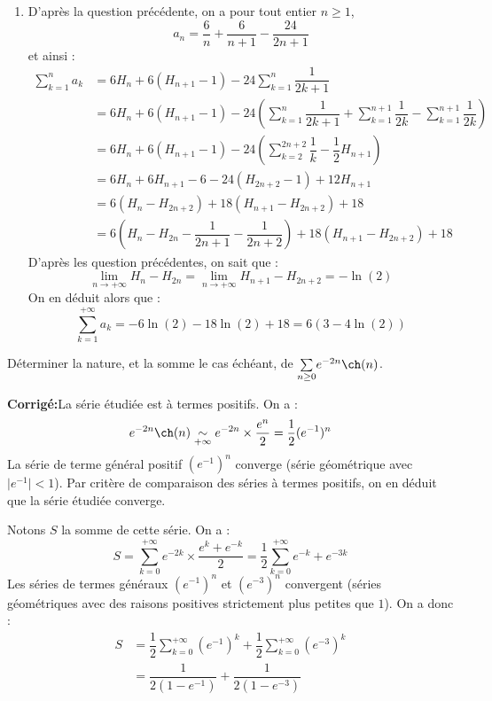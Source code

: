 \documentclass[a4paper,twoside,french,10pt]{VcCours}
\newcommand{\corr}{\textbf{Corrigé:}}
\newcommand{\Sum}[2]{\ensuremath{\textstyle{\sum\limits_{#1}^{#2}}}}
\begin{document}
\begin{enumerate}
\item D'après la question précédente, on a pour tout entier $n \geq 1$,
$$ a_n = \dfrac{6}{n} + \dfrac{6}{n+1} - \dfrac{24}{2n+1}$$
et ainsi :
\begin{align*}
\sum_{k=1}^n a_k & = 6 H_n + 6(H_{n+1}-1)- 24 \sum_{k=1}^n \dfrac{1}{2k+1} \\
& = 6 H_n + 6(H_{n+1}-1)- 24 \left( \sum_{k=1}^n \dfrac{1}{2k+1} +  \sum_{k=1}^{n+1} \dfrac{1}{2k} - \sum_{k=1}^{n+1} \dfrac{1}{2k} \right) \\
& =6 H_n + 6(H_{n+1}-1)-24 \left( \sum_{k=2}^{2n+2} \dfrac{1}{k} -  \dfrac{1}{2} H_{n+1} \right) \\
& = 6H_n + 6 H_{n+1} - 6 - 24 (H_{2n+2}-1) + 12 H_{n+1} \\
& = 6(H_n - H_{2n+2}) + 18(H_{n+1}- H_{2n+2}) + 18 \\
& = 6 \left( H_n - H_{2n} - \dfrac{1}{2n+1} - \dfrac{1}{2n+2} \right) + 18 (H_{n+1}- H_{2n+2})  + 18
\end{align*}
D'après les question précédentes, on sait que :
$$ \lim_{n \rightarrow + \infty} H_n- H_{2n} = \lim_{n \rightarrow + \infty} H_{n+1}- H_{2n+2} = - \ln(2)$$
On en déduit alors que :
$$ \sum_{k=1}^{+ \infty} a_k = -6\ln(2) -18 \ln(2) + 18 = 6(3- 4 \ln(2))$$
\end{enumerate}

\medskip

\begin{Exercice}{} Déterminer la nature, et la somme le cas échéant, de $\Sum{n \geq 0}{} e^{-2n} \ch(n)$.
\end{Exercice}

\corr La série étudiée est à termes positifs. On a :
$$ e^{-2n} \ch(n) \underset{+ \infty}{\sim} e^{-2n} \times \dfrac{e^n}{2} = \dfrac{1}{2} (e^{-1})^n$$
La série de terme général positif $(e^{-1})^n$ converge (série géométrique avec $\vert e^{-1} \vert <1$). Par critère de comparaison des séries à termes positifs, on en déduit que la série étudiée converge. 

\medskip

\noindent Notons $S$ la somme de cette série. On a :
$$ S = \sum_{k=0}^{+ \infty} e^{-2k} \times \dfrac{e^k + e^{-k}}{2} = \dfrac{1}{2} \sum_{k=0}^{+ \infty} e^{-k} + e^{-3k}$$
Les séries de termes généraux $(e^{-1})^n$ et $(e^{-3})^n$ convergent (séries géométriques avec des raisons positives strictement plus petites que $1$). On a donc :
\begin{align*}
S & = \dfrac{1}{2} \sum_{k=0}^{+ \infty} (e^{-1})^k + \dfrac{1}{2} \sum_{k=0}^{+ \infty} (e^{-3})^k \\
& = \dfrac{1}{2(1-e^{-1})} + \dfrac{1}{2(1-e^{-3})}
\end{align*}
\end{document}
